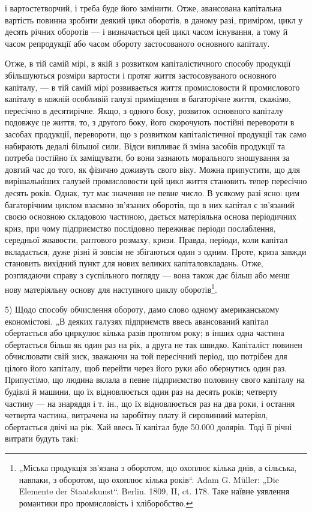 \parcont{}  %
і вартостетворчий, і треба буде його замінити. Отже, авансована капітальна
вартість повинна зробити деякий цикл оборотів, в даному разі, приміром, цикл
у десять річних оборотів — і визначається цей цикл часом існування,
а тому й часом репродукції або часом обороту застосованого основного
капіталу.

Отже, в тій самій мірі, в якій з розвитком капіталістичного способу
продукції збільшуються розміри вартости і протяг життя застосовуваного
основного капіталу, — в тій самій мірі розвивається життя промисловости
й промислового капіталу в кожній особливій галузі приміщення в багаторічне
життя, скажімо, пересічно в десятирічне. Якщо, з одного боку,
розвиток основного капіталу подовжує це життя, то, з другого боку,
його скорочують постійні перевороти в засобах продукції, перевороти,
що з розвитком капіталістичної продукції так само набирають дедалі
більшої сили. Відси випливає й зміна засобів продукції та потреба постійно
їх заміщувати, бо вони зазнають морального зношування за довгий
час до того, як фізично доживуть свого віку. Можна припустити, що
для вирішальніших галузей промисловости цей цикл життя становить тепер
пересічно десять років. Однак, тут має значення не певне число. В усякому
разі ясно: цим багаторічним циклом взаємно зв’язаних оборотів, що
в них капітал є зв’язаний своєю основною складовою частиною, дається
матеріяльна основа періодичних криз, при чому підприємство послідовно
переживає періоди послаблення, середньої жвавости, раптового розмаху,
кризи. Правда, періоди, коли капітал вкладається, дуже різні й зовсім не
збігаються один з одним. Проте, криза завжди становить вихідний пункт
для нових великих капіталовкладань. Отже, розглядаючи справу з суспільного
погляду — вона також дає більш або менш нову матеріяльну
основу для наступного циклу оборотів\footnote{
„Міська продукція зв’язана з оборотом, що охоплює кілька днів, а сільська,
навпаки, з оборотом, що охоплює кілька років“. Adam G. Müller: „Die Elemente
der Staatskunst“. Berlin. 1809, II, ct. 178. Таке наївне уявлення романтики
про промисловість і хліборобство.
}.

5) Щодо способу обчислення обороту, дамо слово одному американському
економістові. „В деяких галузях підприємств ввесь авансований
капітал обертається або циркулює кілька разів протягом року; в інших
одна частина обертається більш як один раз на рік, а друга не так швидко.
Капіталіст повинен обчислювати свій зиск, зважаючи на той пересічний
період, що потрібен для цілого його капіталу, щоб перейти через його
руки або обернутись один раз. Припустімо, що людина вклала в певне
підприємство половину свого капіталу на будівлі й машини, що їх відновлюється
один раз на десять років; четверту частину — на знаряддя і т. ін.,
що їх відновлюється раз на два роки, і остання четверта частина, витрачена
на заробітну плату й сировинний матеріял, обертається двічі на рік.
Хай ввесь її капітал буде \num{50.000} долярів. Тоді її річні витрати будуть
такі:
